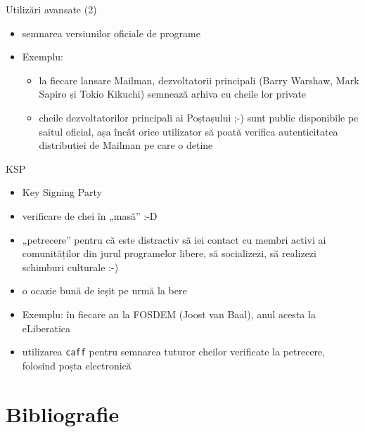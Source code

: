 \documentclass{beamer}
\begin{document}
\begin{frame}{Utilizări avansate (2)}
  \begin{itemize}
    \item semnarea versiunilor oficiale de programe
    \item Exemplu:
    \begin{itemize}
      \item la fiecare lansare Mailman, dezvoltatorii principali (Barry
      Warshaw, Mark Sapiro și Tokio Kikuchi) semnează arhiva cu cheile lor
      private
      \item cheile dezvoltatorilor principali ai Poștașului ;-) sunt
      public disponibile pe saitul oficial, așa încât orice utilizator să
      poată verifica autenticitatea distribuției de Mailman pe care o deține
    \end{itemize}
  \end{itemize}
\end{frame}

\begin{frame}{KSP}
  \begin{itemize}
    \item Key Signing Party
    \item verificare de chei în „masă” :-D
    \item „petrecere” pentru că este distractiv să iei contact cu membri
    activi ai comunităților din jurul programelor libere, să socializezi,
    să realizezi schimburi culturale :-)
    \item o ocazie bună de ieșit pe urmă la bere
    \item Exemplu: în fiecare an la FOSDEM (Joost van Baal), anul acesta la
    eLiberatica
    \item utilizarea \texttt{caff} pentru semnarea tuturor cheilor verificate
    la petrecere, folosind poșta electronică
  \end{itemize}
\end{frame}

\section{Bibliografie}
\frame{\tableofcontents[currentsection]}
\end{document}

